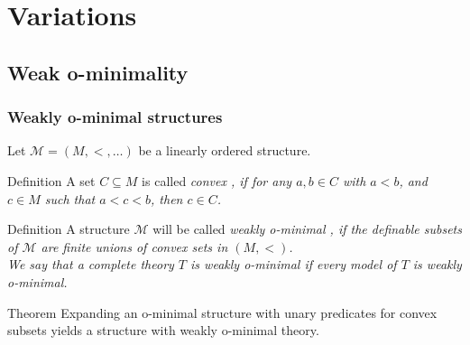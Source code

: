 
\section{Variations}
\subsection{Weak o-minimality}

\begin{frame}[c]\frametitle{Weakly o-minimal structures}
	
	Let $\mathcal{M} = (M,<, \dots )$ be a linearly ordered structure.
    
	\begin{beamerboxesrounded}[shadow=true]{Definition}
		A set $C \subseteq M$ is called \em convex \em, if for any $a,b \in C$ with $a<b$, and $c\in M$ such that $a<c<b$, then $c \in C$. 
	\end{beamerboxesrounded}

	\begin{beamerboxesrounded}[shadow=true]{Definition}
		A structure $\mathcal{M}$ will be called \em weakly o-minimal \em, if the definable subsets of $\mathcal{M}$ are finite unions of convex sets in $(M,<)$.\\
		We say that a complete theory $T$ is \em weakly o-minimal \em if every model of $T$ is weakly o-minimal. 
	\end{beamerboxesrounded}

	\begin{beamerboxesrounded}[shadow=true]{Theorem}
		Expanding an o-minimal structure with unary predicates for convex subsets yields a structure with weakly o-minimal theory.
	\end{beamerboxesrounded}

\end{frame}

